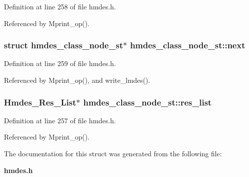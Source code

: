 Definition at line 258 of file hmdes.h.

Referenced by Mprint\_\-op().
\subsubsection{\setlength{\rightskip}{0pt plus 5cm}struct \bf{hmdes\_\-class\_\-node\_\-st}$\ast$ \bf{hmdes\_\-class\_\-node\_\-st::next}}\label{structhmdes__class__node__st_4981097e77036642db9206eedbd169fe}




Definition at line 259 of file hmdes.h.

Referenced by Mprint\_\-op(), and write\_\-lmdes().
\subsubsection{\setlength{\rightskip}{0pt plus 5cm}\bf{Hmdes\_\-Res\_\-List}$\ast$ \bf{hmdes\_\-class\_\-node\_\-st::res\_\-list}}\label{structhmdes__class__node__st_e7634e6cf1a90dc4ca88aaf1d236886b}




Definition at line 257 of file hmdes.h.

Referenced by Mprint\_\-op().

The documentation for this struct was generated from the following file:\begin{CompactItemize}
\item 
\bf{hmdes.h}\end{CompactItemize}
